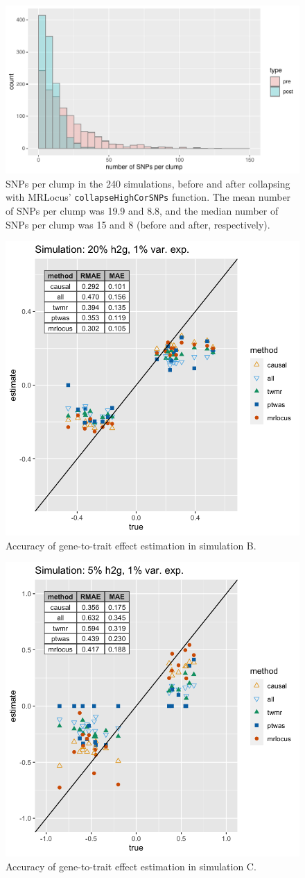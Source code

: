 \documentclass[11pt]{article}
\begin{document}
\begin{figure}[!ht]
  \centering
  \includegraphics[width=.7\textwidth]{figs/snps-per-clump}
  \caption{SNPs per clump in the 240 simulations, before and after
    collapsing with MRLocus’ \texttt{collapseHighCorSNPs}
    function. The mean number of SNPs per clump was 19.9 and 8.8, and
    the median number of SNPs per clump was 15 and 8 (before and
    after, respectively).}
\end{figure}

\begin{figure}[!ht]
  \centering
  \includegraphics[width=.6\textwidth]{figs/sim3.png}
  \caption{Accuracy of gene-to-trait effect estimation in simulation B.}
\end{figure}

\begin{figure}[!ht]
  \centering
  \includegraphics[width=.6\textwidth]{figs/sim2.png}
  \caption{Accuracy of gene-to-trait effect estimation in simulation C.}
\end{figure}
\end{document}
